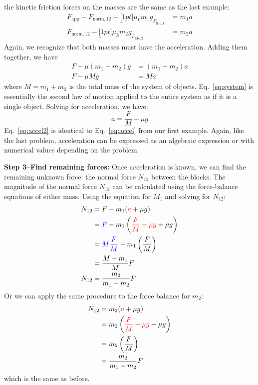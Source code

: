 the kinetic friction forces on the masses are the same as the last example:
\begin{align*}
  F_\text{app}-F_{\text{norm},12}-\underbracket[1pt]{\mu_km_1g}_{F_{\text{fric},1}} &=m_1a\\
  F_{\text{norm},12}-\underbracket[1pt]{\mu_km_2g}_{F_{\text{fric},2}} &=m_2a
\end{align*}
Again, we recognize that both masses must have the acceleration. Adding them
together, we have
\begin{align}
  \nonumber
  F - \mu(m_1+m_2)g  &= (m_1+m_2)a\\
  F - \mu Mg  &= Ma \label{eq:system}
\end{align}
where $M=m_1+m_2$ is the total mass of the system of objects.
Eq.~\ref{eq:system} is essentially the second law of motion applied to the
entire system as if it is a single object. Solving for acceleration, we have:
\begin{equation}
  a= \frac FM- \mu g
  \label{eq:accel2}
\end{equation}
Eq.~\ref{eq:accel2} is identical to Eq.~\ref{eq:accel} from our first example.
Again, like the last problem, acceleration can be expressed as an algebraic
expression or with numerical values depending on the problem.

\textbf{Step 3--Find remaining forces:} Once acceleration is known, we can find
the remaining unknown force: the normal force $N_{12}$ between the blocks.
The magnitude of the normal force $N_{12}$ can be calculated using the
force-balance equations of either mass. Using the equation for $M_1$ and solving
for $N_{12}$:
\begin{align*}
  N_{12} &= F- m_1({\color{red}a}+\mu g)\\
  &= {\color{blue}F} - m_1\left({\color{red}\frac FM-\mu g} +\mu g\right) \\
  &= {\color{blue}M\frac FM} - m_1\left(\frac FM\right) \\
  &= \frac{M-m_1}M F\\
  N_{12}&= \frac{m_2}{m_1+m_2} F
\end{align*}
Or we can apply the same procedure to the force balance for $m_2$:
\begin{align*}
  N_{12} &= m_2 ({\color{red}a} + \mu g) \\
  &= m_2 \left({\color{red}\frac FM-\mu g} + \mu g\right) \\
  &= m_2 \left(\frac FM\right) \\
  &= \frac{m_2}{m_1+m_2} F
\end{align*}
which is the same as before.

